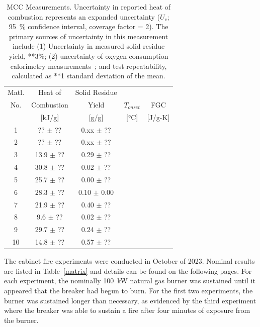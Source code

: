 \documentclass[12pt]{article}
\begin{document}
\begin{table}
\begin{center}
\caption[MCC Measurements]{MCC Measurements. Uncertainty in reported heat of combustion represents an expanded uncertainty ($U_c$; 95~\% confidence interval, coverage factor = 2).  The primary sources of uncertainty in this measurement include (1) Uncertainty in measured solid residue yield, **3\%; (2) uncertainty of oxygen consumption calorimetry measurements~\cite{Huggett:1}; and test repeatability, calculated as **1 standard deviation of the mean.}
\label{MCC}
\begin{tabular}{ccccc}
\hline
Matl. & Heat of		& Solid Residue & &\\
No.    & Combustion    	& Yield & $T_{onset}$& FGC\\
       & [kJ/g]      	    	& [g/g] & [°C] & [J/g-K]\\
 \hline
1	   & 	?? $\pm$ ?? & 0.xx $\pm$ ?? &&\\
2	   & 	?? $\pm$ ?? & 0.xx $\pm$ ??&&\\
3	   & 	13.9 $\pm$ ?? & 0.29 $\pm$ ??&&\\
4	   & 	30.8 $\pm$ ?? & 0.02 $\pm$ ??&&\\
5	   & 	25.7 $\pm$ ?? & 0.00 $\pm$ ??&&\\
6	   & 	28.3 $\pm$ ?? & 0.10 $\pm$ 0.00&&\\
7	   & 	21.9 $\pm$ ?? & 0.40 $\pm$ ??&&\\
8	   & 	9.6 $\pm$ ?? & 0.02 $\pm$ ??&&\\
9	   & 	29.7 $\pm$ ?? & 0.24 $\pm$ ??&&\\
10	   & 	14.8 $\pm$ ?? & 0.57 $\pm$ ??&&\\
\hline
\end{tabular}
\end{center}
\end{table}


The cabinet fire experiments were conducted in October of 2023. Nominal results are listed in Table~\ref{matrix} and details can be found on the following pages. For each experiment, the nominally 100~kW natural gas burner was sustained until it appeared that the breaker had begun to burn. For the first two experiments, the burner was sustained longer than necessary, as evidenced by the third experiment where the breaker was able to sustain a fire after four minutes of exposure from the burner.
\end{document}
